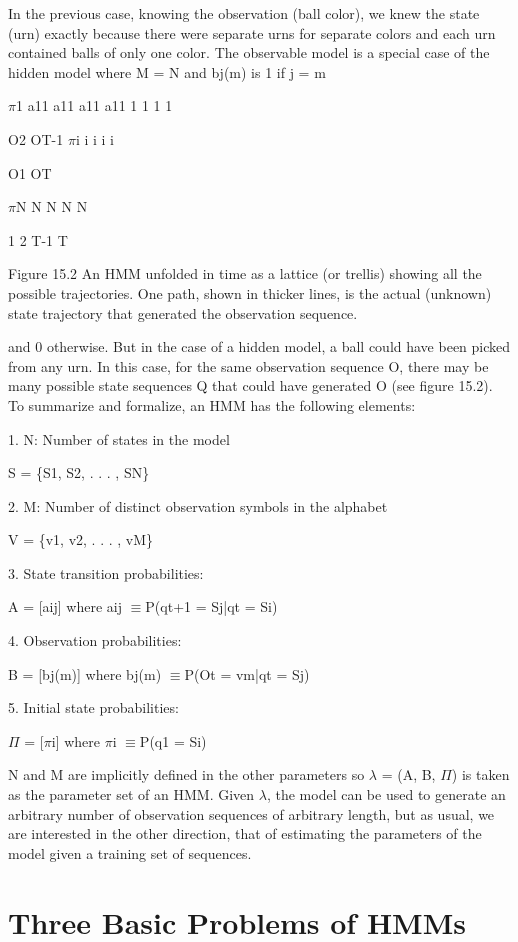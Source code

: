 In the previous case, knowing the observation (ball color), we knew the state (urn) exactly because there were separate urns for separate colors and each urn contained balls of only one color. The observable model is a special case of the hidden model where M = N and bj(m) is 1 if j = m

$\pi$1 a11 a11 a11 a11 1 1 1 1

O2 OT-1 $\pi$i i i i i

O1 OT

$\pi$N N N N N

1 2 T-1 T

Figure 15.2 An HMM unfolded in time as a lattice (or trellis) showing all the possible trajectories. One path, shown in thicker lines, is the actual (unknown) state trajectory that generated the observation sequence.

and 0 otherwise. But in the case of a hidden model, a ball could have been picked from any urn. In this case, for the same observation sequence O, there may be many possible state sequences Q that could have generated O (see figure 15.2). To summarize and formalize, an HMM has the following elements:

1. N: Number of states in the model

S = \{S1, S2, . . . , SN\}

2. M: Number of distinct observation symbols in the alphabet

V = \{v1, v2, . . . , vM\}

3. State transition probabilities:

A = [aij] where aij $\equiv$P(qt+1 = Sj|qt = Si)

4. Observation probabilities:

B = [bj(m)] where bj(m) $\equiv$P(Ot = vm|qt = Sj)

5. Initial state probabilities:

$\Pi$ = [$\pi$i] where $\pi$i $\equiv$P(q1 = Si)

N and M are implicitly defined in the other parameters so $\lambda$ = (A, B, $\Pi$) is taken as the parameter set of an HMM. Given $\lambda$, the model can be used to generate an arbitrary number of observation sequences of arbitrary length, but as usual, we are interested in the other direction, that of estimating the parameters of the model given a training set of sequences.

\section{Three Basic Problems of HMMs}

